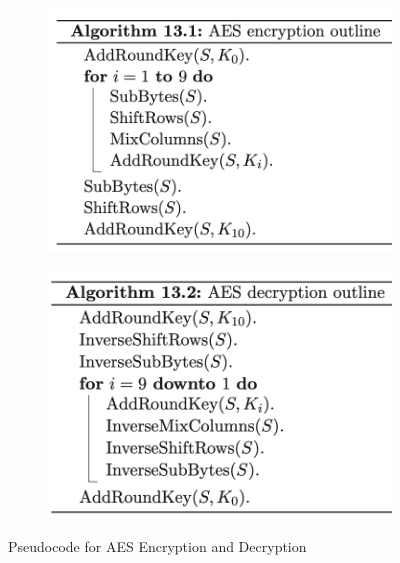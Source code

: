 \begin{figure}[h!]
    \centering
    \begin{subfigure}[t]{0.40\textwidth}
        \centering
        \includegraphics[width=\textwidth]{img/AESencrypt.png}
        \end{subfigure}
        \hfill
        \begin{subfigure}[t]{0.40\textwidth}
            \centering
            \includegraphics[width=\textwidth]{img/AESdecrypt.png}
        \end{subfigure}
    \caption{Pseudocode for AES Encryption and Decryption}
\end{figure}

